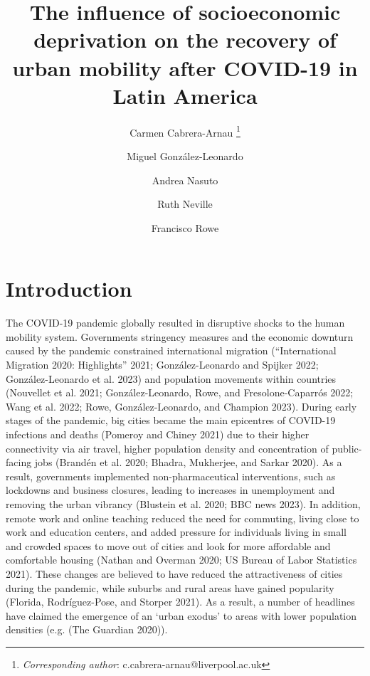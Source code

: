 \documentclass[11pt,letterpaper]{article}
\title{The influence of socioeconomic deprivation on the recovery of urban mobility after COVID-19 in Latin America}
\author[1]{Carmen Cabrera-Arnau \thanks{\textit{Corresponding author}: c.cabrera-arnau@liverpool.ac.uk}}
\author[2]{Miguel González-Leonardo}
\author[1]{Andrea Nasuto}
\author[1]{Ruth Neville}
\author[1]{Francisco Rowe}
\affil[1]{Geographic Data Science Lab, Department of Geography and Planning, University of Liverpool, Liverpool, United Kingdom}
\affil[2]{Center for Demographic, Urban and Environmental Studies, El Colegio de México (COLMEX), Mexico City, Mexico}
\date{}
\begin{document}
\maketitle


\begin{abstract}



\end{abstract}



\pagebreak

\section{Introduction}

The COVID-19 pandemic globally resulted in disruptive shocks to the
human mobility system. Governments stringency measures and the economic
downturn caused by the pandemic constrained international migration
({``International Migration 2020: Highlights''} 2021; González-Leonardo
and Spijker 2022; González-Leonardo et al. 2023) and population
movements within countries (Nouvellet et al. 2021; González-Leonardo,
Rowe, and Fresolone-Caparrós 2022; Wang et al. 2022; Rowe,
González-Leonardo, and Champion 2023). During early stages of the
pandemic, big cities became the main epicentres of COVID-19 infections
and deaths (Pomeroy and Chiney 2021) due to their higher connectivity
via air travel, higher population density and concentration of
public-facing jobs (Brandén et al. 2020; Bhadra, Mukherjee, and Sarkar
2020). As a result, governments implemented non-pharmaceutical
interventions, such as lockdowns and business closures, leading to
increases in unemployment and removing the urban vibrancy (Blustein et
al. 2020; BBC news 2023). In addition, remote work and online teaching
reduced the need for commuting, living close to work and education
centers, and added pressure for individuals living in small and crowded
spaces to move out of cities and look for more affordable and
comfortable housing (Nathan and Overman 2020; US Bureau of Labor
Statistics 2021). These changes are believed to have reduced the
attractiveness of cities during the pandemic, while suburbs and rural
areas have gained popularity (Florida, Rodríguez-Pose, and Storper
2021). As a result, a number of headlines have claimed the emergence of
an `urban exodus' to areas with lower population densities (e.g. (The
Guardian 2020)).
\end{document}
